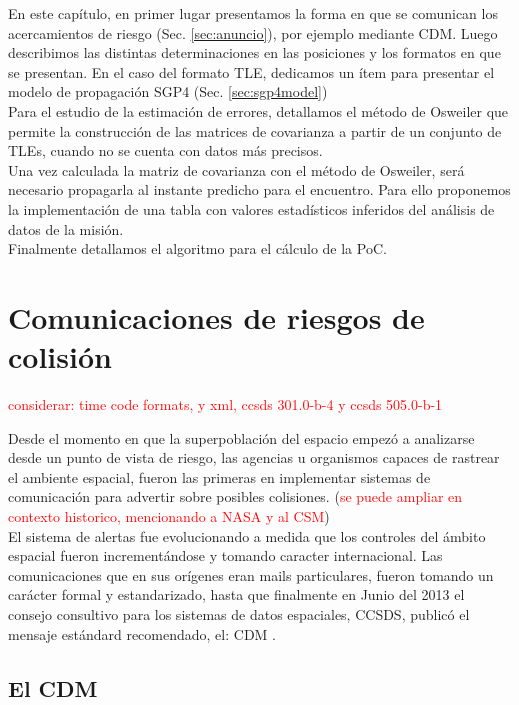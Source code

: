En este cap\'itulo, en primer lugar presentamos la forma en que se comunican los acercamientos de riesgo (Sec. \ref{sec:anuncio}), por ejemplo mediante \ac{CDM}. Luego describimos las distintas determinaciones en las posiciones y los formatos en que se presentan. En el caso del formato TLE, dedicamos un \'item para presentar el modelo de propagaci\'on SGP4 (Sec. \ref{sec:sgp4model})\\
Para el estudio de la estimaci\'on de errores, detallamos el m\'etodo de Osweiler \citep{Osweiler} que permite la construcci\'on de las matrices de covarianza a partir de un conjunto de TLEs, cuando no se cuenta con datos m\'as precisos.\\
Una vez calculada la matriz de covarianza con el m\'etodo de Osweiler, ser\'a necesario propagarla al instante predicho para el encuentro. Para ello proponemos la implementaci\'on de una tabla con valores estad\'isticos inferidos del an\'alisis de datos de la misi\'on.\\
Finalmente detallamos el algoritmo para el c\'alculo de la PoC.\\

\section{Comunicaciones de riesgos de colisi\'on}{\label{sec:anuncio}}
\textcolor{red}{considerar: time code formats, y xml, ccsds 301.0-b-4 y ccsds 505.0-b-1}

Desde el momento en que la superpoblaci\'on del espacio empez\'o a analizarse desde un punto de vista de riesgo, las agencias u organismos capaces de rastrear el ambiente espacial, fueron las primeras en implementar sistemas de comunicaci\'on para advertir sobre posibles colisiones. (\textcolor{red}{se puede ampliar en contexto historico, mencionando a NASA y al CSM})\\
El sistema de alertas fue evolucionando a medida que los controles del \'ambito espacial fueron increment\'andose y tomando caracter internacional. Las comunicaciones que en sus or\'igenes eran mails particulares, fueron tomando un car\'acter formal y estandarizado, hasta que finalmente en Junio del 2013 el consejo consultivo para los sistemas de datos espaciales, \ac{CCSDS}, public\'o el mensaje est\'andard recomendado, el: \ac{CDM} \citep{CDMstd}.\\

\subsection{El CDM}

